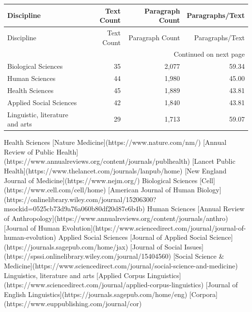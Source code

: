 \begin{longtable}{lrrr}
\toprule
Discipline & Text Count & Paragraph Count & Paragraphs/Text \\
\midrule
\endfirsthead
\toprule
Discipline & Text Count & Paragraph Count & Paragraphs/Text \\
\midrule
\endhead
\midrule
\multicolumn{4}{r}{Continued on next page} \\
\midrule
\endfoot
\bottomrule
\endlastfoot
Biological Sciences & 35 & 2,077 & 59.34 \\
Human Sciences & 44 & 1,980 & 45.00 \\
Health Sciences & 45 & 1,889 & 43.81 \\
Applied Social Sciences & 42 & 1,840 & 43.81 \\
Linguistic, literature and arts & 29 & 1,713 & 59.07 \\
\end{longtable}


Health Sciences
 [Nature Medicine](https://www.nature.com/nm/)
 [Annual Review of Public Health](https://www.annualreviews.org/content/journals/publhealth)
 [Lancet Public Health](https://www.thelancet.com/journals/lanpub/home)
 [New England Journal of Medicine](https://www.nejm.org/)
Biological Sciences
 [Cell](https://www.cell.com/cell/home)
 [American Journal of Human Biology](https://onlinelibrary.wiley.com/journal/15206300?msockid=0525cb73d9a76a060b80df20d87e6b4b)
Human Sciences
 [Annual Review of Anthropology](https://www.annualreviews.org/content/journals/anthro)
 [Journal of Human Evolution](https://www.sciencedirect.com/journal/journal-of-human-evolution)
Applied Social Sciences
 [Journal of Applied Social Science](https://journals.sagepub.com/home/jax)
 [Journal of Social Issues](https://spssi.onlinelibrary.wiley.com/journal/15404560)
 [Social Science & Medicine](https://www.sciencedirect.com/journal/social-science-and-medicine)
Linguistics, literature and arts
 [Applied Corpus Linguistics](https://www.sciencedirect.com/journal/applied-corpus-linguistics)
 [Journal of English Linguistics](https://journals.sagepub.com/home/eng)
 [Corpora](https://www.euppublishing.com/journal/cor)